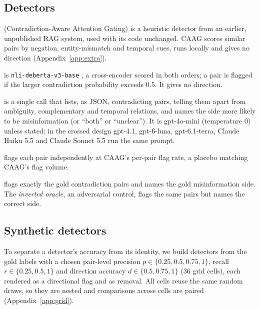 \subsection{Detectors}
\label{sec:detectors}
\begin{description}[leftmargin=0pt,itemsep=1pt,topsep=2pt]
\item[CAAG] (Contradiction-Aware Attention Gating) is a heuristic detector from an earlier, unpublished RAG system,
used with its code unchanged. CAAG scores similar pairs by negation, entity-mismatch and temporal cues, runs locally
and gives no direction (Appendix~\ref{app:extra}).
\item[NLI] is \texttt{nli-deberta-v3-base} \citep{he2023debertav3}, a cross-encoder scored in both orders; a pair is
flagged if the larger contradiction probability exceeds $0.5$. It gives no direction.
\item[LLM] is a single call that lists, as JSON, contradicting pairs, telling them apart from ambiguity, complementary and
temporal relations, and names the side more likely to be misinformation (or ``both'' or ``unclear''). It is
gpt-4o-mini (temperature 0) unless stated; in the crossed design gpt-4.1, gpt-6-luna, gpt-6.1-terra, Claude Haiku 5.5
and Claude Sonnet 5.5 run the same prompt.
\item[Random] flags each pair independently at CAAG's per-pair flag rate, a placebo matching CAAG's flag volume.
\item[Oracle] flags exactly the gold contradiction pairs and names the gold misinformation side. The
\emph{inverted oracle}, an adversarial control, flags the same pairs but names the correct side.
\end{description}

\subsection{Synthetic detectors}
\label{sec:synthetic}
To separate a detector's accuracy from its identity, we build detectors from the gold labels with a chosen pair-level
precision $p\in\{0.25,0.5,0.75,1\}$, recall $r\in\{0.25,0.5,1\}$ and direction accuracy $d\in\{0.5,0.75,1\}$ (36
grid cells), each rendered as a directional flag and as removal. All cells reuse the same random draws, so they are nested
and comparisons across cells are paired (Appendix~\ref{app:grid}).
